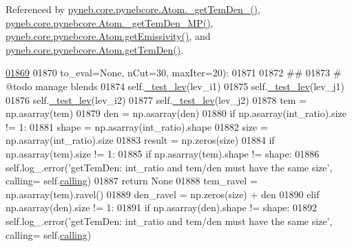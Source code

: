 Referenced by \hyperlink{pynebcore_8py_source_l01869}{pyneb.\-core.\-pynebcore.\-Atom.\-\_\-get\-Tem\-Den\-\_()}, \hyperlink{pynebcore_8py_source_l02046}{pyneb.\-core.\-pynebcore.\-Atom.\-\_\-get\-Tem\-Den\-\_\-\-M\-P()}, \hyperlink{pynebcore_8py_source_l01782}{pyneb.\-core.\-pynebcore.\-Atom.\-get\-Emissivity()}, and \hyperlink{pynebcore_8py_source_l02126}{pyneb.\-core.\-pynebcore.\-Atom.\-get\-Tem\-Den()}.


\begin{DoxyCode}
\hypertarget{classpyneb_1_1core_1_1pynebcore_1_1_atom_l01869}{}\hyperlink{classpyneb_1_1core_1_1pynebcore_1_1_atom_ad1d75f64b27a6acee079b5738b69dabe}{01869} 
01870                   to\_eval=\textcolor{keywordtype}{None}, nCut=30, maxIter=20):
01871 
01872         \textcolor{comment}{##}
01873         \textcolor{comment}{# @todo manage blends}
01874         self.\hyperlink{classpyneb_1_1core_1_1pynebcore_1_1_atom_afa4b9737dcd5bed31e25e8f0b6dc4730}{\_test\_lev}(lev\_i1)
01875         self.\hyperlink{classpyneb_1_1core_1_1pynebcore_1_1_atom_afa4b9737dcd5bed31e25e8f0b6dc4730}{\_test\_lev}(lev\_j1)
01876         self.\hyperlink{classpyneb_1_1core_1_1pynebcore_1_1_atom_afa4b9737dcd5bed31e25e8f0b6dc4730}{\_test\_lev}(lev\_i2)
01877         self.\hyperlink{classpyneb_1_1core_1_1pynebcore_1_1_atom_afa4b9737dcd5bed31e25e8f0b6dc4730}{\_test\_lev}(lev\_j2)
01878         tem = np.asarray(tem)
01879         den = np.asarray(den)
01880         \textcolor{keywordflow}{if} np.asarray(int\_ratio).size != 1:
01881             shape = np.asarray(int\_ratio).shape
01882             size = np.asarray(int\_ratio).size
01883             result = np.zeros(size) 
01884             \textcolor{keywordflow}{if} np.asarray(tem).size != 1:
01885                 \textcolor{keywordflow}{if} np.asarray(tem).shape != shape:
01886                     self.log\_.error(\textcolor{stringliteral}{'getTemDen: int\_ratio and tem/den must have the same size'}, calling=
      self.\hyperlink{classpyneb_1_1core_1_1pynebcore_1_1_atom_a373b7735acf4f528b54bddf373ad67a1}{calling})
01887                     \textcolor{keywordflow}{return} \textcolor{keywordtype}{None}
01888                 tem\_ravel = np.asarray(tem).ravel()
01889                 den\_ravel = np.zeros(size) + den
01890             \textcolor{keywordflow}{elif} np.asarray(den).size != 1:
01891                 \textcolor{keywordflow}{if} np.asarray(den).shape != shape:
01892                     self.log\_.error(\textcolor{stringliteral}{'getTemDen: int\_ratio and tem/den must have the same size'}, calling=
      self.\hyperlink{classpyneb_1_1core_1_1pynebcore_1_1_atom_a373b7735acf4f528b54bddf373ad67a1}{calling})

\end{DoxyCode}
